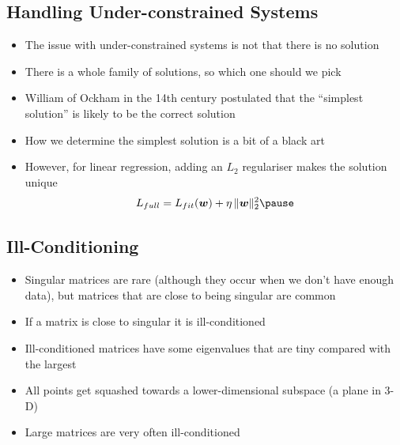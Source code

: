 \begin{slide}
\section{Handling Under-constrained Systems}

\begin{PauseHighLight}
  \begin{itemize}
  \item The issue with under-constrained systems is not that there is
    no solution\pause
  \item There is a whole family of solutions\pause, so which one
    should we pick\pauseb
  \item William of Ockham in the 14th century postulated that the
    ``simplest solution'' is likely to be the correct solution\pause
  \item How we determine the simplest solution is a bit of a black
    art\pause
  \item However, for linear regression, adding an $L_2$ regulariser
    makes the solution unique
    \begin{align*}
      L_{full} = L_{fit}(\bm{w}) + \eta \, \len{\bm{w}}^2_2\pause
    \end{align*}
  \end{itemize}
\end{PauseHighLight}

\end{slide}

\Outline %

\begin{slide}
  \section{Ill-Conditioning}

  \begin{PauseHighLight}
    \begin{itemize}
    \item Singular matrices are rare (although they occur when we don't
      have enough data), but matrices that are close to
      being singular are common\pause
    \item If a matrix is close to singular it is ill-conditioned\pause
    \item Ill-conditioned matrices have some eigenvalues that are tiny compared with the largest\pause
    \item All points get squashed towards a lower-dimensional subspace (a plane in 3-D)\pause
    \item Large matrices are very often ill-conditioned\pause
    \end{itemize}
  \end{PauseHighLight}
\end{slide}

